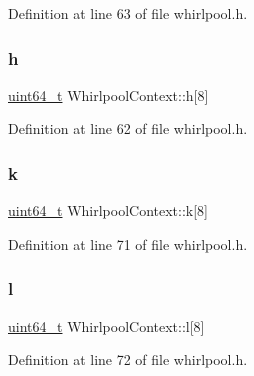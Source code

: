 Definition at line 63 of file whirlpool.\+h.

\mbox{\label{structWhirlpoolContext_a25cc44a7c21c2bb3686cc19b95783a83}} 
\subsubsection{\texorpdfstring{h}{h}}
{\footnotesize\ttfamily \hyperlink{stdint_8h_aec6fcb673ff035718c238c8c9d544c47}{uint64\+\_\+t} Whirlpool\+Context\+::h\mbox{[}8\mbox{]}}



Definition at line 62 of file whirlpool.\+h.

\mbox{\label{structWhirlpoolContext_a89a25dce17ea119db7c22a74b4424fd9}} 
\subsubsection{\texorpdfstring{k}{k}}
{\footnotesize\ttfamily \hyperlink{stdint_8h_aec6fcb673ff035718c238c8c9d544c47}{uint64\+\_\+t} Whirlpool\+Context\+::k\mbox{[}8\mbox{]}}



Definition at line 71 of file whirlpool.\+h.

\mbox{\label{structWhirlpoolContext_ad3194c0b7a6c4e1ea1d0552943a1490f}} 
\subsubsection{\texorpdfstring{l}{l}}
{\footnotesize\ttfamily \hyperlink{stdint_8h_aec6fcb673ff035718c238c8c9d544c47}{uint64\+\_\+t} Whirlpool\+Context\+::l\mbox{[}8\mbox{]}}



Definition at line 72 of file whirlpool.\+h.

\mbox{\label{structWhirlpoolContext_a35dddd961573cb16dfaa2ffaf0c3fba1}} 
